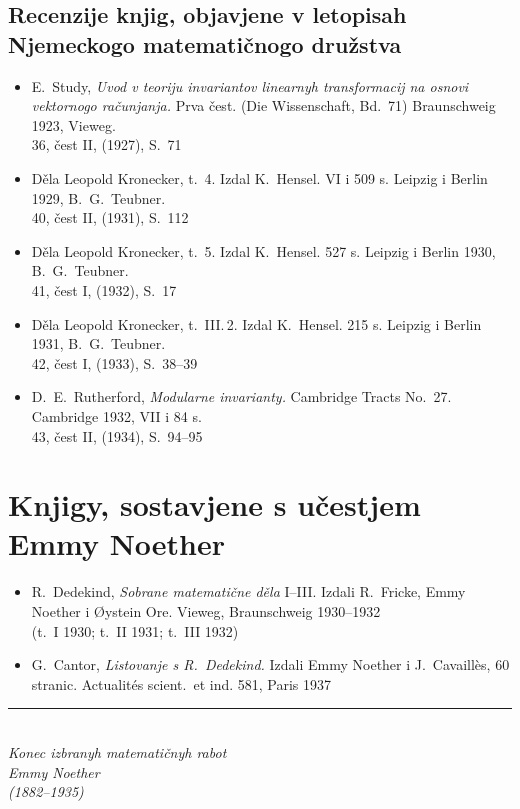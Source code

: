 \documentclass[11pt]{article}
\newcommand{\foreign}[1]{#1}
\begin{document}
\subsection*{Recenzije knjig, objavjene v letopisah Njemeckogo matematičnogo družstva}

\begin{itemize}[leftmargin=1.5em,itemsep=0.2em]
\item E.\ Study, \textit{Uvod v teoriju invariantov linearnyh transformacij na osnovi vektornogo računjanja.} Prva čest. (\foreign{Die Wissenschaft}, Bd.~71) Braunschweig 1923, Vieweg.\\
36, čest II, (1927), S.~71

\item Děla Leopold Kronecker, t.~4. Izdal K.\ Hensel. VI i 509 s. Leipzig i Berlin 1929, B.\ G.\ Teubner.\\
40, čest II, (1931), S.~112

\item Děla Leopold Kronecker, t.~5. Izdal K.\ Hensel. 527 s. Leipzig i Berlin 1930, B.\ G.\ Teubner.\\
41, čest I, (1932), S.~17

\item Děla Leopold Kronecker, t.~III.\,2. Izdal K.\ Hensel. 215 s. Leipzig i Berlin 1931, B.\ G.\ Teubner.\\
42, čest I, (1933), S.~38--39

\item D.\ E.\ Rutherford, \textit{Modularne invarianty.} \foreign{Cambridge Tracts No.~27.} Cambridge 1932, VII i 84 s.\\
43, čest II, (1934), S.~94--95
\end{itemize}

\newpage
\section*{Knjigy, sostavjene s učestjem Emmy Noether}

\begin{itemize}[leftmargin=1.5em,itemsep=0.5em]
\item R.\ Dedekind, \textit{Sobrane matematične děla} I--III. Izdali R.\ Fricke, Emmy Noether i Øystein Ore. Vieweg, Braunschweig 1930--1932\\
(t.~I 1930; t.~II 1931; t.~III 1932)

\item G.\ Cantor, \textit{Listovanje s R.\ Dedekind.} Izdali Emmy Noether i J.\ Cavaillès, 60 stranic. \foreign{Actualités scient.\ et ind.} 581, Paris 1937
\end{itemize}

\vfill

\begin{center}
\rule{0.5\textwidth}{0.4pt}\\[1em]
\textit{Konec izbranyh matematičnyh rabot}\\[0.5em]
\textit{Emmy Noether}\\[0.5em]
\textit{(1882--1935)}
\end{center}
\end{document}
